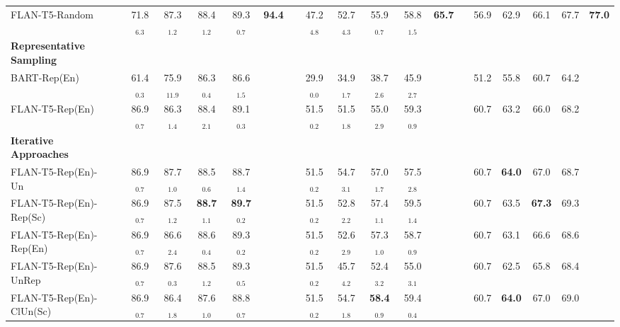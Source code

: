 \documentclass[11pt]{article}
\theoremstyle{definition}
\begin{document}
\begin{table*}[hbt]
{\begin{tabular}{l|cccccc|cccccc|cccccc}
FLAN-T5-Random &
& 71.8$_{6.3}$ & 87.3$_{1.2}$ & 88.4$_{1.2}$ & 89.3$_{0.7}$ & \textbf{94.4} &
& 47.2$_{4.8}$ & 52.7$_{4.3}$ & 55.9$_{0.7}$ & 58.8$_{1.5}$ & \textbf{65.7} &
& 56.9 & 62.9 & 66.1 & 67.7 & \textbf{77.0} \\

\hdashline

\textbf{Representative Sampling} &
& & & & & &
& & & & & &
& & & & & \\

BART-Rep(En) &
& 61.4$_{0.3}$ & 75.9$_{11.9}$ & 86.3$_{0.4}$ & 86.6$_{1.5}$ & &
& 29.9$_{0.0}$ & 34.9$_{1.7}$ & 38.7$_{2.6}$ & 45.9$_{2.7}$ & &
& 51.2 & 55.8 & 60.7 & 64.2 & \\

FLAN-T5-Rep(En) &
& 86.9$_{0.7}$ & 86.3$_{1.4}$ & 88.4$_{2.1}$ & 89.1$_{0.3}$ & &
& 51.5$_{0.2}$ & 51.5$_{1.8}$ & 55.0$_{2.9}$ & 59.3$_{0.9}$ & &
& 60.7 & 63.2 & 66.0 & 68.2 & \\

\hdashline

\textbf{Iterative Approaches} &
& & & & & &
& & & & & &
& & & & & \\

FLAN-T5-Rep(En)-Un &
& 86.9$_{0.7}$ & 87.7$_{1.0}$ & 88.5$_{0.6}$ & 88.7$_{1.4}$ & &
& 51.5$_{0.2}$ & 54.7$_{3.1}$ & 57.0$_{1.7}$ & 57.5$_{2.8}$ & &
& 60.7 & \textbf{64.0} & 67.0 & 68.7 & \\

FLAN-T5-Rep(En)-Rep(Sc) &
& 86.9$_{0.7}$ & 87.5$_{1.2}$ & \textbf{88.7}$_{1.1}$ & \textbf{89.7}$_{0.2}$ & &
& 51.5$_{0.2}$ & 52.8$_{2.2}$ & 57.4$_{1.1}$ & 59.5$_{1.4}$ & &
& 60.7 & 63.5 & \textbf{67.3} & 69.3 & \\

FLAN-T5-Rep(En)-Rep(En) &
& 86.9$_{0.7}$ & 86.6$_{2.4}$ & 88.6$_{0.4}$ & 89.3$_{0.2}$ & &
& 51.5$_{0.2}$ & 52.6$_{2.9}$ & 57.3$_{1.0}$ & 58.7$_{0.9}$ & &
& 60.7 & 63.1 & 66.6 & 68.6 & \\

FLAN-T5-Rep(En)-UnRep &
& 86.9$_{0.7}$ & 87.6$_{0.3}$ & 88.5$_{1.2}$ & 89.3$_{0.5}$ & &
& 51.5$_{0.2}$ & 45.7$_{4.2}$ & 52.4$_{3.2}$ & 55.0$_{3.1}$ & &
& 60.7 & 62.5 & 65.8 & 68.4 & \\

FLAN-T5-Rep(En)-ClUn(Sc) &
& 86.9$_{0.7}$ & 86.4$_{1.8}$ & 87.6$_{1.0}$ & 88.8$_{0.7}$ & &
& 51.5$_{0.2}$ & 54.7$_{1.8}$ & \textbf{58.4}$_{0.9}$ & 59.4$_{0.4}$ & &
& 60.7 & \textbf{64.0} & 67.0 & 69.0 & \\


\end{tabular}}
\end{table*}
\end{document}
